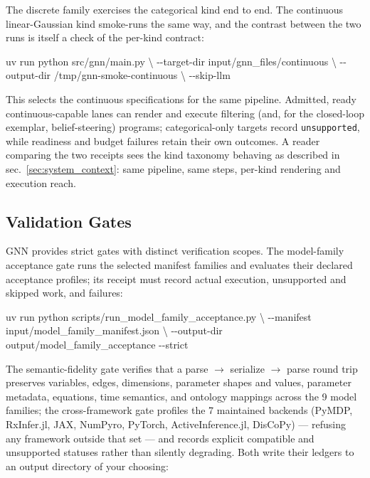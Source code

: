 \documentclass[
  english,
  9pt,
]{extarticle}
\newenvironment{Shaded}{}{}
\newcommand{\AttributeTok}[1]{\textcolor[rgb]{0.49,0.56,0.16}{#1}}
\newcommand{\DataTypeTok}[1]{\textcolor[rgb]{0.56,0.13,0.00}{#1}}
\newcommand{\ExtensionTok}[1]{#1}
\newcommand{\NormalTok}[1]{#1}
\begin{document}
The discrete family exercises the categorical kind end to end. The
continuous linear-Gaussian kind smoke-runs the same way, and the
contrast between the two runs is itself a check of the per-kind
contract:

\begin{Shaded}
\begin{Highlighting}[]
\ExtensionTok{uv}\NormalTok{ run python src/gnn/main.py }\DataTypeTok{\textbackslash{}}
  \AttributeTok{{-}{-}target{-}dir}\NormalTok{ input/gnn\_files/continuous }\DataTypeTok{\textbackslash{}}
  \AttributeTok{{-}{-}output{-}dir}\NormalTok{ /tmp/gnn{-}smoke{-}continuous }\DataTypeTok{\textbackslash{}}
  \AttributeTok{{-}{-}skip{-}llm}
\end{Highlighting}
\end{Shaded}

This selects the continuous specifications for the same pipeline.
Admitted, ready continuous-capable lanes can render and execute
filtering (and, for the closed-loop exemplar, belief-steering) programs;
categorical-only targets record \texttt{unsupported}, while readiness
and budget failures retain their own outcomes. A reader comparing the
two receipts sees the kind taxonomy behaving as described in
sec.~\ref{sec:system_context}: same pipeline, same steps, per-kind
rendering and execution reach.

\subsection{Validation Gates}\label{validation-gates}

GNN provides strict gates with distinct verification scopes. The
model-family acceptance gate runs the selected manifest families and
evaluates their declared acceptance profiles; its receipt must record
actual execution, unsupported and skipped work, and failures:

\begin{Shaded}
\begin{Highlighting}[]
\ExtensionTok{uv}\NormalTok{ run python scripts/run\_model\_family\_acceptance.py }\DataTypeTok{\textbackslash{}}
  \AttributeTok{{-}{-}manifest}\NormalTok{ input/model\_family\_manifest.json }\DataTypeTok{\textbackslash{}}
  \AttributeTok{{-}{-}output{-}dir}\NormalTok{ output/model\_family\_acceptance }\AttributeTok{{-}{-}strict}
\end{Highlighting}
\end{Shaded}

The semantic-fidelity gate verifies that a parse \texorpdfstring{\ensuremath{\to}}{->} serialize \texorpdfstring{\ensuremath{\to}}{->} parse
round trip preserves variables, edges, dimensions, parameter shapes and
values, parameter metadata, equations, time semantics, and ontology
mappings across the 9 model families; the cross-framework gate profiles
the 7 maintained backends (PyMDP, RxInfer.jl, JAX, NumPyro, PyTorch,
ActiveInference.jl, DisCoPy) --- refusing any framework outside that set
--- and records explicit compatible and unsupported statuses rather than
silently degrading. Both write their ledgers to an output directory of
your choosing:
\end{document}
